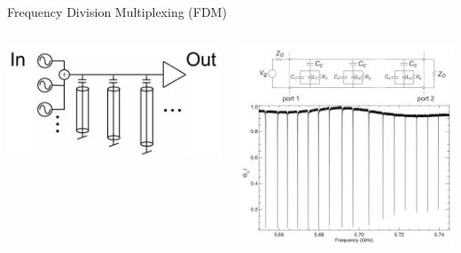 \documentclass[ignorenonframetext,12pt]{beamer}
\begin{document}
\begin{frame}{Frequency Division Multiplexing (FDM)}
\begin{columns}
\begin{column}{0.5\textwidth}
				\begin{center}
								\includegraphics[width=\textwidth]{fdm1}
				\end{center}
								\end{column}
								\begin{column}{0.5\textwidth}
								\begin{center}
												\includegraphics[width=\textwidth]{fdm2}
								\end{center}
												\end{column}
								\end{columns}

\end{frame}

\end{document}
